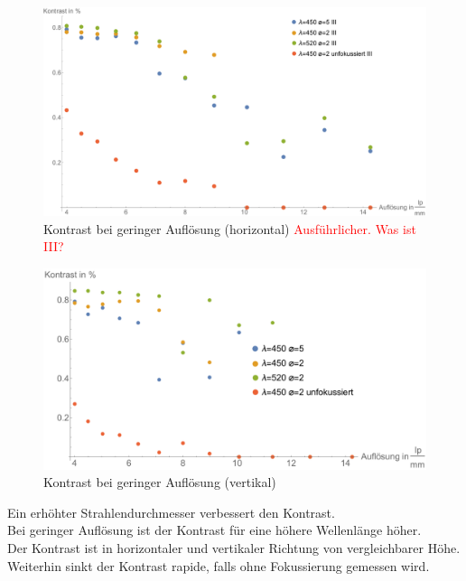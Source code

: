 \begin{minipage}{\linewidth}
\begin{figure}[H]
	\centering
\includegraphics[width=1.0\linewidth]{IMAGE/Versuch2Plot1horizontal2.pdf}
	\caption{Kontrast bei geringer Auflösung (horizontal) \textcolor{red}{Ausführlicher. Was ist III?}}
	\label{fig:Versuch2_Plot2h1}
\end{figure} 

\begin{figure}[H]
	\centering
\includegraphics[width=1.0\linewidth]{IMAGE/Versuch2Plot1vertikal2.pdf}
	\caption{Kontrast bei geringer Auflösung (vertikal)}
	\label{fig:Versuch2_Plot2v1}
\end{figure} 

Ein erhöhter Strahlendurchmesser verbessert den Kontrast.\\
Bei geringer Auflösung ist der Kontrast für eine höhere Wellenlänge höher.\\
Der Kontrast ist in horizontaler und vertikaler Richtung von vergleichbarer Höhe.\\
Weiterhin sinkt der Kontrast rapide, falls ohne Fokussierung gemessen wird.
\end{minipage}

